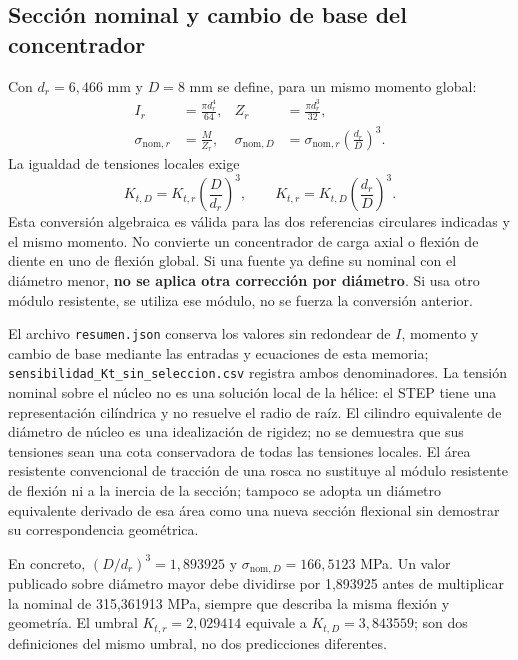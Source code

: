 \subsection{Sección nominal y cambio de base del concentrador}
Con $d_r=6,466$ mm y $D=8$ mm se define, para un mismo momento global:
\begin{align}
 I_r&=\frac{\pi d_r^4}{64}, & Z_r&=\frac{\pi d_r^3}{32},\\
 \sigma_{\mathrm{nom},r}&=\frac{M}{Z_r}, &
 \sigma_{\mathrm{nom},D}&=\sigma_{\mathrm{nom},r}\left(\frac{d_r}{D}\right)^3.
\end{align}
La igualdad de tensiones locales exige
\begin{equation}
 K_{t,D}=K_{t,r}\left(\frac{D}{d_r}\right)^3,
 \qquad
 K_{t,r}=K_{t,D}\left(\frac{d_r}{D}\right)^3.
 \label{eq:conversion_Kt_bases}
\end{equation}
Esta conversión algebraica es válida para las dos referencias circulares
indicadas y el mismo momento. No convierte un concentrador de carga axial
o flexión de diente en uno de flexión global. Si una fuente ya define
su nominal con el diámetro menor, \textbf{no se aplica otra corrección
por diámetro}. Si usa otro módulo resistente, se utiliza ese módulo,
no se fuerza la conversión anterior.

El archivo \texttt{resumen.json} conserva los valores sin redondear de
$I$, momento y cambio de base mediante las entradas y ecuaciones de esta
memoria; \texttt{sensibilidad\_Kt\_sin\_seleccion.csv} registra ambos
denominadores. La tensión nominal sobre el núcleo no es una solución
local de la hélice: el STEP tiene una representación cilíndrica y no
resuelve el radio de raíz. El cilindro equivalente de diámetro de núcleo
es una idealización de rigidez; no se demuestra que sus tensiones sean
una cota conservadora de todas las tensiones locales.
El área resistente convencional de tracción de una rosca no sustituye
al módulo resistente de flexión ni a la inercia de la sección; tampoco
se adopta un diámetro equivalente derivado de esa área como una nueva
sección flexional sin demostrar su correspondencia geométrica.

En concreto, $(D/d_r)^3=1,893925$ y
$\sigma_{\mathrm{nom},D}=166,5123$ MPa. Un valor publicado sobre diámetro
mayor debe dividirse por 1,893925 antes de multiplicar la nominal de
315,361913 MPa, siempre que describa la misma flexión y geometría.
El umbral $K_{t,r}=2,029414$ equivale a $K_{t,D}=3,843559$; son dos
definiciones del mismo umbral, no dos predicciones diferentes.

